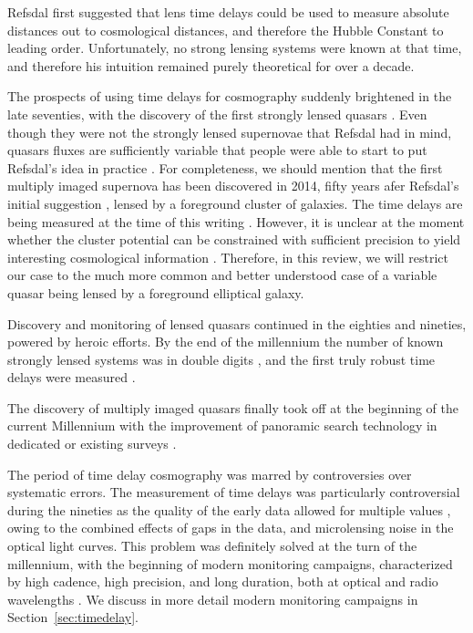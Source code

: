 Refsdal \cite{Ref64} first suggested that lens time delays could be
used to measure absolute distances out to cosmological distances, and
therefore the Hubble Constant to leading order. Unfortunately, no
strong lensing systems were known at that time, and therefore his
intuition remained purely theoretical for over a decade. 

The prospects of using time delays for cosmography suddenly brightened
in the late seventies, with the discovery of the first strongly lensed
quasars \cite{WCW79}. Even though they were not the strongly lensed
supernovae that Refsdal had in mind, quasars fluxes are sufficiently
variable \cite{Van82} that people were able to start to put Refsdal's
idea in practice \cite{Van89}. For completeness, we should mention
that the first multiply imaged supernova has been discovered in 2014,
fifty years afer Refsdal's initial suggestion \cite{Kel++15}, lensed
by a foreground cluster of galaxies. The time delays are being
measured at the time of this writing
\cite{Rod++16,Kel++16}. However, it is unclear at the moment whether the 
cluster potential can be constrained with sufficient precision to
yield interesting cosmological information \cite{Tre+16}. Therefore,
in this review, we will restrict our case to the much more common and
better understood case of a variable quasar being lensed by a
foreground elliptical galaxy.

Discovery and monitoring of lensed quasars continued in the eighties
and nineties, powered by heroic efforts. By the end of the millennium
the number of known strongly lensed systems was in double digits
\cite{CSS02}, and the first truly robust time delays were measured
\cite{Kun++97,Sch++97}. 

The discovery of multiply imaged quasars finally took off at the
beginning of the current Millennium with the improvement of panoramic
search technology in dedicated or existing surveys
\cite{Bro++03,Oguri:2006p5865,Agn++15}.

The period of time delay cosmography was marred by controversies over
systematic errors.  The measurement of time delays was particularly
controversial during the nineties as the quality of the early data
allowed for multiple values \cite{PRH92}, owing to the combined
effects of gaps in the data, and microlensing noise in the optical
light curves. This problem was definitely solved at the turn of the
millennium, with the beginning of modern monitoring campaigns,
characterized by high cadence, high precision, and long duration, both
at optical and radio wavelengths
\cite{Fas++99,Fas++02,Bur++02,Eig++05}. We discuss in more detail 
modern monitoring campaigns in Section~\ref{sec:timedelay}.

